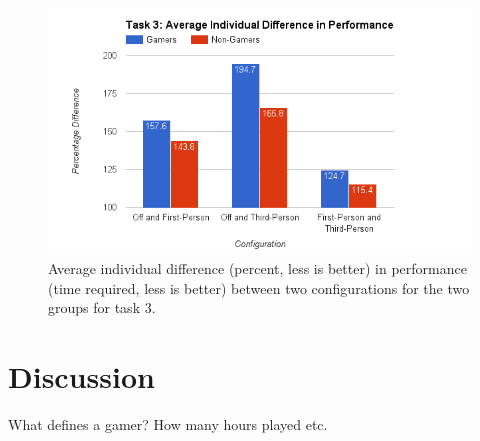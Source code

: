 \documentclass[runningheads,a4paper,oribibl]{llncs}
\begin{document}
\begin{figure}
   \centering
   \includegraphics[width=\textwidth]{ExternalMaterial/Task3GraphD}
   \caption{Average individual difference (percent, less is better) in performance (time required, less is better) between two configurations for the two groups for task 3.} \label{fig:Task3GraphD}
\end{figure}




























\section{Discussion} \label{sec:Discussion}
What defines a gamer? How many hours played etc.
\end{document}
